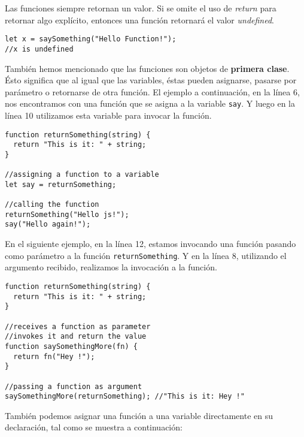 \documentclass[a4paper, oneside, titlepage, 12pt]{paper}
\begin{document}
Las funciones siempre retornan un valor. Si se omite el uso de \textit{return} para retornar algo explícito, entonces una función retornará el valor \textit{undefined}.

\begin{verbatim}
let x = saySomething("Hello Function!");
//x is undefined
\end{verbatim}

También hemos mencionado que las funciones son objetos de \textbf{primera clase}. Ésto significa que al igual que las variables, éstas pueden asignarse, pasarse por parámetro o retornarse de otra función. El ejemplo a continuación, en la línea 6, nos encontramos con una función que se asigna a la variable \colorbox{verylight}{\lstinline{say}}. Y luego en la línea 10 utilizamos esta variable para invocar la función.

\begin{verbatim}
function returnSomething(string) {
  return "This is it: " + string;
}

//assigning a function to a variable
let say = returnSomething;

//calling the function
returnSomething("Hello js!");
say("Hello again!");
\end{verbatim}

En el siguiente ejemplo, en la línea 12, estamos invocando una función pasando como parámetro a la función \texttt{returnSomething}. Y en la línea 8, utilizando el argumento recibido, realizamos la invocación a la función.

\begin{verbatim}
function returnSomething(string) {
  return "This is it: " + string;
}

//receives a function as parameter
//invokes it and return the value
function saySomethingMore(fn) {
  return fn("Hey !");
}

//passing a function as argument
saySomethingMore(returnSomething); //"This is it: Hey !"
\end{verbatim}

También podemos asignar una función a una variable directamente en su declaración, tal como se muestra a continuación:
\end{document}
